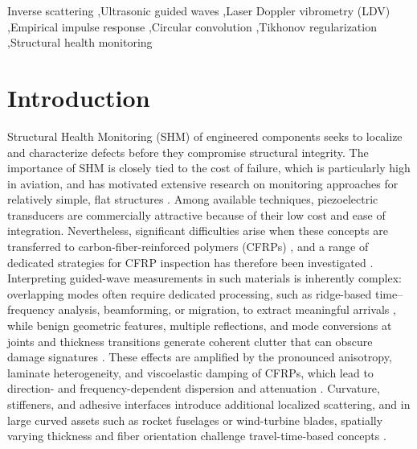 \documentclass[a4paper,fleqn]{cas-sc}
\begin{document}
\begin{keywords}
Inverse scattering \sep Ultrasonic guided waves \sep Laser Doppler vibrometry (LDV) \sep Empirical impulse response \sep Circular convolution \sep Tikhonov regularization \sep Structural health monitoring
\end{keywords}


\maketitle

\section{Introduction}\label{Introduction}

Structural Health Monitoring (SHM) of engineered components seeks to localize and characterize defects before they compromise structural integrity. The importance of SHM is closely tied to the cost of failure, which is particularly high in aviation, and has motivated extensive research on monitoring approaches for relatively simple, flat structures \cite{Aviation_Book}. Among available techniques, piezoelectric transducers are commercially attractive because of their low cost and ease of integration. Nevertheless, significant difficulties arise when these concepts are transferred to carbon-fiber-reinforced polymers (CFRPs) \cite{Aircraft_NDT}, and a range of dedicated strategies for CFRP inspection has therefore been investigated \cite{Current_Methods,Composite_pipe_ndt}. Interpreting guided-wave measurements in such materials is inherently complex: overlapping modes often require dedicated processing, such as ridge-based time--frequency analysis, beamforming, or migration, to extract meaningful arrivals \cite{Raghavan2007}, while benign geometric features, multiple reflections, and mode conversions at joints and thickness transitions generate coherent clutter that can obscure damage signatures \cite{Cawley2002,Olisa2021}. These effects are amplified by the pronounced anisotropy, laminate heterogeneity, and viscoelastic damping of CFRPs, which lead to direction- and frequency-dependent dispersion and attenuation \cite{Calomfirescu2008,Ostachowicz2024}. Curvature, stiffeners, and adhesive interfaces introduce additional localized scattering, and in large curved assets such as rocket fuselages or wind-turbine blades, spatially varying thickness and fiber orientation challenge travel-time-based concepts \cite{Yu2025,Chia2023,Jankauskas2011,Mustapha2024,Park2017}.
\end{document}

